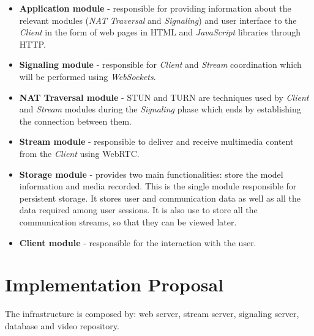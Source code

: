 \begin{itemize}

\item \textbf{Application module} - responsible for providing information about the relevant modules (\emph{NAT Traversal} and \emph{Signaling}) and user interface to the \emph{Client} in the form of web pages in \ac{HTML} and \emph{JavaScript} libraries through \ac{HTTP}.
 
\item \textbf{Signaling module} - responsible for \emph{Client} and \emph{Stream} coordination which will be performed using \emph{WebSockets}.

 \item \textbf{NAT Traversal module} - \ac{STUN} and \ac{TURN} are techniques used by \emph{Client} and \emph{Stream} modules during the \emph{Signaling} phase which ends by establishing the connection between them.

 \item \textbf{Stream module} - responsible to deliver and receive multimedia content from the \emph{Client} using \ac{WebRTC}. 

 \item \textbf{Storage module} - provides two main functionalities: store the model information and media recorded. This is the single module responsible for persistent storage. It stores user and communication data as well as all the data required among user sessions. It is also use to store all the communication streams, so that they can be viewed later.

 \item \textbf{Client module} - responsible for the interaction with the user.

\end{itemize}



 
\section{Implementation Proposal}
The infrastructure is composed by: web server, stream server, signaling server, database and video repository.

